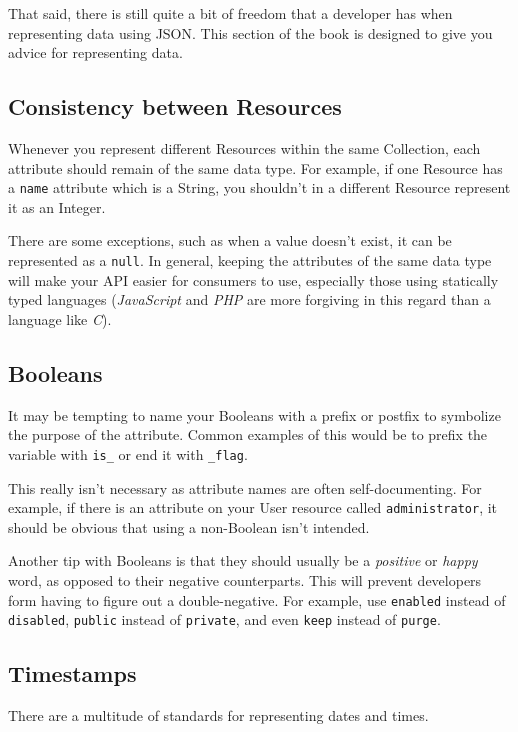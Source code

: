 \documentclass{book}
\begin{document}
That said, there is still quite a bit of freedom that a developer has when representing data using JSON. This section of the book is designed to give you advice for representing data.

\subsection{Consistency between Resources}

Whenever you represent different Resources within the same Collection, each attribute should remain of the same data type. For example, if one Resource has a \texttt{name} attribute which is a String, you shouldn't in a different Resource represent it as an Integer.

There are some exceptions, such as when a value doesn't exist, it can be represented as a \texttt{null}. In general, keeping the attributes of the same data type will make your API easier for consumers to use, especially those using statically typed languages (\emph{JavaScript} and \emph{PHP} are more forgiving in this regard than a language like \emph{C}).

\subsection{Booleans}

It may be tempting to name your Booleans with a prefix or postfix to symbolize the purpose of the attribute. Common examples of this would be to prefix the variable with \texttt{is\_} or end it with \texttt{\_flag}.

This really isn't necessary as attribute names are often self-documenting. For example, if there is an attribute on your User resource called \texttt{administrator}, it should be obvious that using a non-Boolean isn't intended.

Another tip with Booleans is that they should usually be a \emph{positive} or \emph{happy} word, as opposed to their negative counterparts. This will prevent developers form having to figure out a double-negative. For example, use \texttt{enabled} instead of \texttt{disabled}, \texttt{public} instead of \texttt{private}, and even \texttt{keep} instead of \texttt{purge}.

\subsection{Timestamps}

There are a multitude of standards for representing dates and times.
\end{document}
